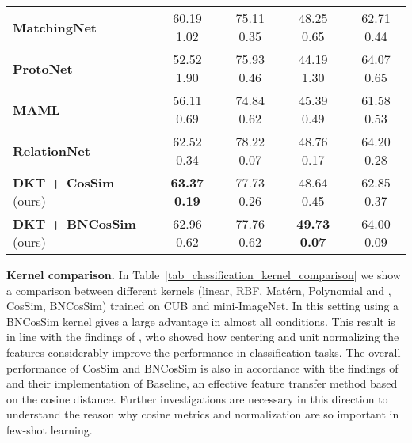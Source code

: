 \documentclass{article}
\begin{document}
\begin{table}[H]
\begin{adjustbox}{width=1.0\columnwidth,center}
{\begin{tabular}{lcccc}
\small{\textbf{MatchingNet}} \citep{vinyals2016matching} & 60.19  \small{1.02} & 75.11  \small{0.35} & 48.25  \small{0.65} & 62.71  \small{0.44} \\
\small{\textbf{ProtoNet}} \citep{snell2017prototypical} & 52.52  \small{1.90} & 75.93  \small{0.46} &44.19  \small{1.30} & 64.07  \small{0.65} \\
\small{\textbf{MAML}}  \citep{finn2017model} & 56.11  \small{0.69} & 74.84  \small{0.62}  &45.39  \small{0.49} & 61.58  \small{0.53} \\
\small{\textbf{RelationNet}} \citep{sung2018learning} & 62.52  \small{0.34} & 78.22  \small{0.07}  & 48.76  \small{0.17} & 64.20  \small{0.28}\\
\hline
\small{\textbf{DKT + CosSim}} (ours) & \textbf{63.37  \small{0.19}} & 77.73  \small{0.26} & 48.64  \small{0.45} & 62.85  \small{0.37} \\
\small{\textbf{DKT + BNCosSim}} (ours) & 62.96  \small{0.62} & 77.76  \small{0.62} & \textbf{49.73  \small{0.07}} & 64.00  \small{0.09} \\
\hline
\end{tabular}
}
\label{tab_classification_accuracy}
 \end{adjustbox}
\end{table}

\textbf{Kernel comparison.} In Table~\ref{tab_classification_kernel_comparison} we show a comparison between different kernels (linear, RBF, Mat\'ern, Polynomial  and , CosSim, BNCosSim) trained on CUB and mini-ImageNet. In this setting using a BNCosSim kernel gives a large advantage in almost all conditions. This result is in line with the findings of \citet{wang2019simpleshot}, who showed how centering and unit normalizing the features considerably improve the performance in classification tasks. The overall performance of CosSim and BNCosSim is also in accordance with the findings of \citet{chen2019closerfewshot} and their implementation of Baseline, an effective feature transfer method based on the cosine distance. Further investigations are necessary in this direction to understand the reason why cosine metrics and normalization are so important in few-shot learning.
\end{document}
